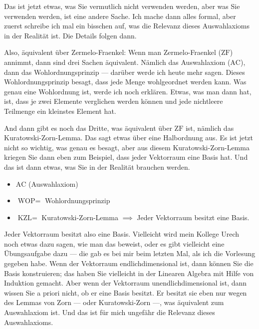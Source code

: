 \begin{spoken-clean}[00:07:30 - 00:09:45]
Das ist jetzt etwas, was Sie vermutlich nicht verwenden werden, aber was Sie verwenden werden, ist eine andere Sache. Ich mache dann alles formal, aber zuerst schreibe ich mal ein bisschen auf, was die Relevanz dieses Auswahlaxioms in der Realität ist. Die Details folgen dann. 

Also, äquivalent über Zermelo-Fraenkel: Wenn man Zermelo-Fraenkel ($\text{ZF}$) annimmt, dann sind drei Sachen äquivalent. Nämlich das Auswahlaxiom ($\text{AC}$), dann das Wohlordnungsprinzip --- darüber werde ich heute mehr sagen. Dieses Wohlordnungsprinzip besagt, dass jede Menge wohlgeordnet werden kann. Was genau eine Wohlordnung ist, werde ich noch erklären. Etwas, was man dann hat, ist, dass je zwei Elemente verglichen werden können und jede nichtleere Teilmenge ein kleinstes Element hat. 

And dann gibt es noch das Dritte, was äquivalent über $\text{ZF}$ ist, nämlich das Kuratowski-Zorn-Lemma. Das sagt etwas über eine Halbordnung aus. Es ist jetzt nicht so wichtig, was genau es besagt, aber aus diesem Kuratowski-Zorn-Lemma kriegen Sie dann eben zum Beispiel, dass jeder Vektorraum eine Basis hat. Und das ist dann etwas, was Sie in der Realität brauchen werden.
\end{spoken-clean}

\begin{math-stroke}
\begin{itemize}
    \item $\text{AC}$ (Auswahlaxiom)
    \item $\text{WOP} =$ Wohlordnungsprinzip
    \item $\text{KZL} =$ Kuratowski-Zorn-Lemma $\implies$ Jeder Vektorraum besitzt eine Basis.
\end{itemize}
\end{math-stroke}

\begin{spoken-clean}[00:09:45 - 00:10:15]
Jeder Vektorraum besitzt also eine Basis. Vielleicht wird mein Kollege Urech noch etwas dazu sagen, wie man das beweist, oder es gibt vielleicht eine Übungsaufgabe dazu --- die gab es bei mir beim letzten Mal, als ich die Vorlesung gegeben habe. Wenn der Vektorraum endlichdimensional ist, dann können Sie die Basis konstruieren; das haben Sie vielleicht in der Linearen Algebra mit Hilfe von Induktion gemacht. Aber wenn der Vektorraum unendlichdimensional ist, dann wissen Sie a priori nicht, ob er eine Basis besitzt. Er besitzt sie eben nur wegen des Lemmas von Zorn --- oder Kuratowski-Zorn ---, was äquivalent zum Auswahlaxiom ist. Und das ist für mich ungefähr die Relevanz dieses Auswahlaxioms.
\end{spoken-clean}


